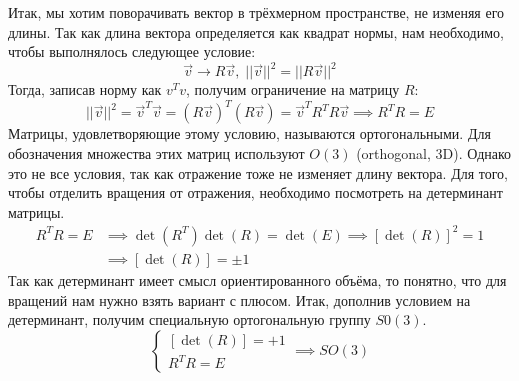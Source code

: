 Итак, мы хотим поворачивать вектор в трёхмерном пространстве, не изменяя его длины. Так как длина вектора определяется как квадрат нормы, нам необходимо, чтобы выполнялось следующее условие:
\[
\Vec{v} \rightarrow R\Vec{v}, \; ||\Vec{v}||^2 = ||R\Vec{v}||^2
\]
Тогда, записав норму как $v^Tv$, получим ограничение на матрицу $R$:
\[
||\Vec{v}||^2 = \Vec{v}^T\Vec{v} = (R\Vec{v})^T(R\Vec{v}) = \Vec{v}^T R^T R\Vec{v} \implies R^T R = E
\]
Матрицы, удовлетворяющие этому условию, называются ортогональными. Для обозначения множества этих матриц используют $O(3)$ (orthogonal, 3D). Однако это не все условия, так как отражение тоже не изменяет длину вектора. Для того, чтобы отделить вращения от отражения, необходимо посмотреть на детерминант матрицы. 
\begin{align*}
    R^T R = E &\implies \det(R^T)\det(R) = \det(E) \implies [\det(R)]^2 = 1  \\
    &\implies [\det(R)] = \pm 1
\end{align*}
Так как детерминант имеет смысл ориентированного объёма, то понятно, что для вращений нам нужно взять вариант с плюсом. Итак, дополнив условием на детерминант, получим специальную ортогональную группу $S0(3)$.
\[
\begin{cases}
    [\det(R)] = +1\\
     R^T R = E
\end{cases} \implies SO(3)
\]

